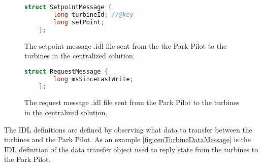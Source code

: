 \begin{figure}[!h]
	\centering
	\begin{lstlisting}[language=C++,tabsize=2,basicstyle=\small]
	struct SetpointMessage {
		long turbineId; //@key
		long setPoint;
	};	
	\end{lstlisting}
	\caption[Centralized Park Pilot setpoint message]{
		\label{fig:cenTurbineSetpointMessage} 
		\footnotesize{%
			The setpoint message .idl file sent from the the Park Pilot to the turbines in the centralized solution.
		}
	}
\end{figure}

\begin{figure}[!h]
	\centering
	\begin{lstlisting}[language=C++,tabsize=2,basicstyle=\small]
	struct RequestMessage {
		long msSinceLastWrite;
	};	
	\end{lstlisting}
	\caption[Centralized Park Pilot request message]{
		\label{fig:cenTurbineRequestMessage} 
		\footnotesize{%
			The request message .idl file sent from the Park Pilot to the turbines in the centralized solution.
		}
	}
\end{figure}

The IDL definitions are defined by observing what data to transfer between the turbines and the Park Pilot. As an example \cref{fig:cenTurbineDataMessage} is the IDL definition of the data transfer object used to reply state from the turbines to the Park Pilot.

%
%
%	
%

